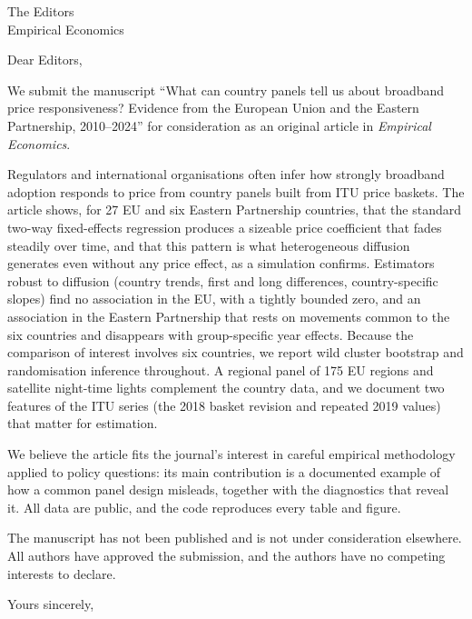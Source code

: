 \documentclass[11pt]{letter}
\begin{document}
\begin{letter}{The Editors\\Empirical Economics}
\opening{Dear Editors,}

We submit the manuscript ``What can country panels tell us about broadband price responsiveness? Evidence from the European Union and the Eastern Partnership, 2010--2024'' for consideration as an original article in \emph{Empirical Economics}.

Regulators and international organisations often infer how strongly broadband adoption responds to price from country panels built from ITU price baskets. The article shows, for 27 EU and six Eastern Partnership countries, that the standard two-way fixed-effects regression produces a sizeable price coefficient that fades steadily over time, and that this pattern is what heterogeneous diffusion generates even without any price effect, as a simulation confirms. Estimators robust to diffusion (country trends, first and long differences, country-specific slopes) find no association in the EU, with a tightly bounded zero, and an association in the Eastern Partnership that rests on movements common to the six countries and disappears with group-specific year effects. Because the comparison of interest involves six countries, we report wild cluster bootstrap and randomisation inference throughout. A regional panel of 175 EU regions and satellite night-time lights complement the country data, and we document two features of the ITU series (the 2018 basket revision and repeated 2019 values) that matter for estimation.

We believe the article fits the journal's interest in careful empirical methodology applied to policy questions: its main contribution is a documented example of how a common panel design misleads, together with the diagnostics that reveal it. All data are public, and the code reproduces every table and figure.

The manuscript has not been published and is not under consideration elsewhere. All authors have approved the submission, and the authors have no competing interests to declare.

\closing{Yours sincerely,}
\end{letter}
\end{document}
